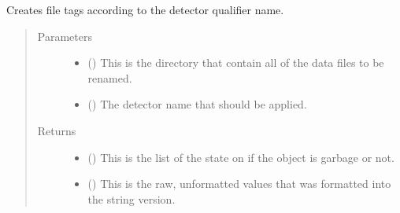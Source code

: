 \documentclass[letterpaper,10pt,english]{sphinxmanual}
\begin{document}
\begin{fulllineitems}
\label{\detokenize{docstrings/ifa_smeargle.reformat.renaming:ifa_smeargle.reformat.renaming.rename_detector}}
Creates file tags according to the detector qualifier name.
\begin{quote}\begin{description}
\item[{Parameters}] \leavevmode\begin{itemize}
\item {} 
 () \textendash{} This is the directory that contain all of the data files to
be renamed.

\item {} 
 () \textendash{} The detector name that should be applied.

\end{itemize}

\item[{Returns}] \leavevmode
\begin{itemize}
\item {} 
 () \textendash{} This is the list of the state on if the object is garbage or
not.

\item {} 
 () \textendash{} This is the raw, unformatted values that was formatted into
the string version.

\end{itemize}


\end{description}\end{quote}

\end{fulllineitems}

\end{document}
